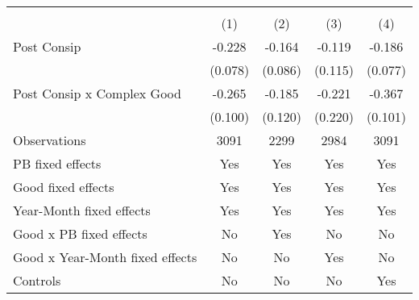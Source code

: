 \begin{tabular}{l*{4}{c}}
\hline\hline
                    &\multicolumn{4}{c}{ }                              \\
                    &\multicolumn{1}{c}{(1)}&\multicolumn{1}{c}{(2)}&\multicolumn{1}{c}{(3)}&\multicolumn{1}{c}{(4)}\\
\hline
Post Consip         &      -0.228&      -0.164&      -0.119&      -0.186\\
                    &     (0.078)&     (0.086)&     (0.115)&     (0.077)\\
[1em]
Post Consip x Complex Good&      -0.265&      -0.185&      -0.221&      -0.367\\
                    &     (0.100)&     (0.120)&     (0.220)&     (0.101)\\
\hline
Observations        &        3091&        2299&        2984&        3091\\
PB fixed effects    &         Yes&         Yes&         Yes&         Yes\\
Good fixed effects  &         Yes&         Yes&         Yes&         Yes\\
Year-Month fixed effects&         Yes&         Yes&         Yes&         Yes\\
Good x PB fixed effects&          No&         Yes&          No&          No\\
Good x  Year-Month fixed effects&          No&          No&         Yes&          No\\
Controls            &          No&          No&          No&         Yes\\
\hline\hline
\end{tabular}
